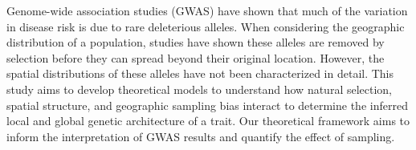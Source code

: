 \abstract
Genome-wide association studies (GWAS) have shown that much of the variation in disease risk is due to rare deleterious alleles. When considering the geographic distribution of a population, studies have shown these alleles are removed by selection before they can spread beyond their original location. However, the spatial distributions of these alleles have not been characterized in detail. This study aims to develop theoretical models to understand how natural selection, spatial structure, and geographic sampling bias interact to determine the inferred local and global genetic architecture of a trait. Our theoretical framework aims to inform the interpretation of GWAS results and quantify the effect of sampling.